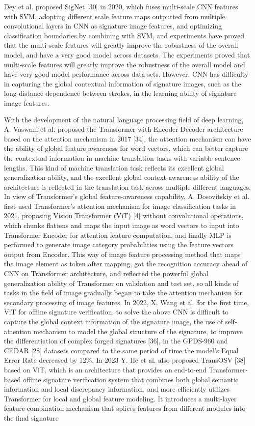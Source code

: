 Dey et al. proposed SigNet [30] in 2020, which fuses multi-scale CNN features with SVM, adopting different scale feature maps outputted from multiple convolutional layers in CNN as signature image features, and optimizing classification boundaries by combining with SVM, and experiments have proved that the multi-scale features will greatly improve the robustness of the overall model, and have a very good model across datasets. The experiments proved that multi-scale features will greatly improve the robustness of the overall model and have very good model performance across data sets. However, CNN has difficulty in capturing the global contextual information of signature images, such as the long-distance dependence between strokes, in the learning ability of signature image features.

With the development of the natural language processing field of deep learning, A. Vaswani et al. proposed the Transformer with Encoder-Decoder architecture based on the attention mechanism in 2017 [34], the attention mechanism can have the ability of global feature awareness for word vectors, which can better capture the contextual information in machine translation tasks with variable sentence lengths. This kind of machine translation task reflects its excellent global generalization ability, and the excellent global context-awareness ability of the architecture is reflected in the translation task across multiple different languages. In view of Transformer's global feature-awareness capability, A. Dosovitskiy et al. first used Transformer's attention mechanism for image classification tasks in 2021, proposing Vision Transformer (ViT) [4] without convolutional operations, which chunks flattens and maps the input image as word vectors to input into Transformer Encoder for attention feature computation, and finally MLP is performed to generate image category probabilities using the feature vectors output from Encoder. This way of image feature processing method that maps the image element as token after mapping, got the recognition accuracy ahead of CNN on Transformer architecture, and reflected the powerful global generalization ability of Transformer on validation and test set, so all kinds of tasks in the field of image gradually began to take the attention mechanism for secondary processing of image features. In 2022, X. Wang et al. for the first time, ViT for offline signature verification, to solve the above CNN is difficult to capture the global context information of the signature image, the use of self-attention mechanism to model the global structure of the signature, to improve the differentiation of complex forged signatures [36], in the GPDS-960 and CEDAR [28] datasets compared to the same period of time the model's Equal Error Rate decreased by 12\%. In 2023 Y. He et al. also proposed TransOSV [38] based on ViT, which is an architecture that provides an end-to-end Transformer-based offline signature verification system that combines both global semantic information and local discrepancy information, and more efficiently utilizes Transformer for local and global feature modeling. It introduces a multi-layer feature combination mechanism that splices features from different modules into the final signature 